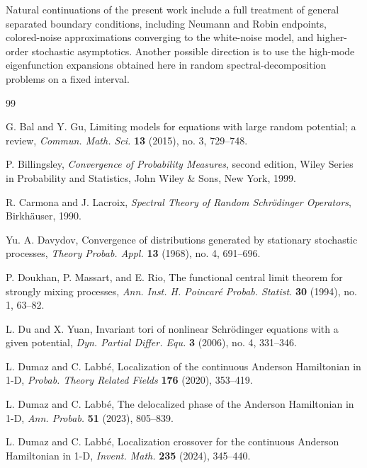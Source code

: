 \documentclass[11pt]{article}
\begin{document}
Natural continuations of the present work include a full treatment of general separated boundary conditions, including Neumann and Robin endpoints, colored-noise approximations converging to the white-noise model, and higher-order stochastic asymptotics. Another possible direction is to use the high-mode eigenfunction expansions obtained here in random spectral-decomposition problems on a fixed interval.

\begin{thebibliography}{99}

G. Bal and Y. Gu,
\newblock Limiting models for equations with large random potential; a review,
\newblock \emph{Commun. Math. Sci.} \textbf{13} (2015), no. 3, 729--748.

P. Billingsley,
\newblock \emph{Convergence of Probability Measures}, second edition,
\newblock Wiley Series in Probability and Statistics, John Wiley \& Sons, New York, 1999.

R. Carmona and J. Lacroix,
\newblock \emph{Spectral Theory of Random Schr\"odinger Operators},
\newblock Birkh\"auser, 1990.

Yu. A. Davydov,
\newblock Convergence of distributions generated by stationary stochastic processes,
\newblock \emph{Theory Probab. Appl.} \textbf{13} (1968), no. 4, 691--696.

P. Doukhan, P. Massart, and E. Rio,
\newblock The functional central limit theorem for strongly mixing processes,
\newblock \emph{Ann. Inst. H. Poincar\'e Probab. Statist.} \textbf{30} (1994), no. 1, 63--82.

L. Du and X. Yuan,
\newblock Invariant tori of nonlinear Schr\"odinger equations with a given potential,
\newblock \emph{Dyn. Partial Differ. Equ.} \textbf{3} (2006), no. 4, 331--346.

L. Dumaz and C. Labb\'{e},
\newblock Localization of the continuous Anderson Hamiltonian in 1-D,
\newblock \emph{Probab. Theory Related Fields} \textbf{176} (2020), 353--419.

L. Dumaz and C. Labb\'{e},
\newblock The delocalized phase of the Anderson Hamiltonian in 1-D,
\newblock \emph{Ann. Probab.} \textbf{51} (2023), 805--839.

L. Dumaz and C. Labb\'{e},
\newblock Localization crossover for the continuous Anderson Hamiltonian in 1-D,
\newblock \emph{Invent. Math.} \textbf{235} (2024), 345--440.


\end{thebibliography}
\end{document}
